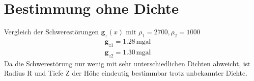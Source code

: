 \documentclass[12pt
,headinclude
,headsepline
,bibtotocnumbered
]{scrartcl}
\begin{document}
\section{Bestimmung ohne Dichte}
Vergleich der Schwerestörungen $\boldsymbol{g}_z(x)$ mit $\rho_1=2700, \rho_2=1000$
\begin{align*}
	\boldsymbol{g}_{z1}=1.28\,\mathrm{mgal}\\
	\boldsymbol{g}_{z2}=1.30\,\mathrm{mgal}
\end{align*}
Da die Schwerestörung nur wenig mit sehr unterschiedlichen Dichten abweicht, ist Radius R und Tiefe Z der Höhe eindeutig bestimmbar trotz unbekannter Dichte.
\end{document}
